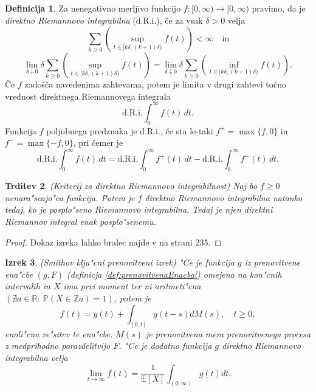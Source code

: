\documentclass[12pt, a4paper, reqno]{amsart}
\theoremstyle{definition}
\newtheorem{definicija}{Definicija}[section]
\theoremstyle{plain}
\newtheorem{izrek}[definicija]{Izrek}
\newtheorem{trditev}[definicija]{Trditev}
\newcommand{\R}{\mathbb{R}}
\newcommand{\E}{\mathbb{E}}
\newcommand{\Prob}{\mathbb{P}}
\newcommand{\1}{\mathds{1}}
\begin{document}
    \begin{definicija}
        Za nenegativno merljivo funkcijo \( f : [0, \infty) \to [0, \infty) \) pravimo, da je \textit{direktno 
        Riemannovo integrabilna} (d.R.i.), če za vsak $\delta > 0$ velja
        \begin{equation*}
            \sum_{k \geq 0} \left( \sup_{t \in [k\delta, (k+1)\delta)} f(t) \right) < \infty \quad \text{in}
        \end{equation*}
        \begin{equation*}
             \lim_{\delta \downarrow 0} \delta \sum_{k \geq 0} \left( \sup_{t \in [k\delta, (k+1)\delta)} f(t) \right) = \lim_{\delta \downarrow 0} \delta \sum_{k \geq 0} \left( \inf_{t \in [k\delta, (k+1)\delta)} f(t) \right).
        \end{equation*}
        Če \(f\) zadošča navedenima zahtevama, potem je limita v drugi zahtevi točno vrednost direktnega Riemannovega integrala
        \[
        \text{d.R.i.} \int_{0}^{\infty} f(t) \, dt.
        \]
        Funkcija \(f\) poljubnega predznaka je d.R.i., če sta le-taki \(f^+ = \max\{f, 0\}\) in \(f^- = \max\{-f, 0\}\), pri čemer je
        \[
        \text{d.R.i.} \int_{0}^{\infty} f(t) \, dt = \text{d.R.i.} \int_{0}^{\infty} f^+(t) \, dt - \text{d.R.i.} \int_{0}^{\infty} f^-(t) \, dt.
        \]
        \label{def:direktnaRieamnovaIntegrabilnost}
    \end{definicija}

    \begin{trditev}(Kriterij za direktno Riemannovo integrabilnost)
        Naj bo $f \geq 0$ nenara"scajo"ca funkcija. Potem je $f$ direktno Riemannovo integrabilna natanko tedaj, ko je
        posplo"seno Riemannovo integrabilna. Tedaj je njen direktni Riemannov integral enak posplo"senemu.
        \label{trd:kriterijZaDirektnoRiemannovoIntegrabilnost}
    \end{trditev}

    \begin{proof}
        Dokaz izreka lahko bralec najde v \cite{8} na strani 235. 
    \end{proof} 

    \begin{izrek}(Smithov klju"cni prenovitveni izrek)
        "Ce je funkcija $g$ iz prenovitvene ena"cbe $(g, F)$ (definicja \ref{def:prenovitvenaEnacba})
        omejena na kon"cnih intervalih in $X$ ima prvi moment ter ni aritmeti"cna 
        $(\nexists a\in\R: \ \Prob\left(X \in \mathbb{Z} a\right) = 1)$, potem je
        \begin{equation*}
            f(t) = g(t) +  \int_{[0, t]}g(t - s)dM(s), \quad t\geq 0,
        \end{equation*}
        enoli"cna re"sitev te ena"cbe. $M(s)$ je prenovitvena mera prenovitvenega procesa z medprihodno 
        porazdelitvijo $F$.
        "Ce je dodatno funkcija $g$ direktno Riemannovo integrabilna velja 
        \begin{equation*}
            \lim_{t\to\infty}f(t) = \frac{1}{\E\left[X\right]}\int_{(0, \infty)}g(t)dt.
        \end{equation*}
        \label{izr:Smith}
    \end{izrek}
\end{document}
